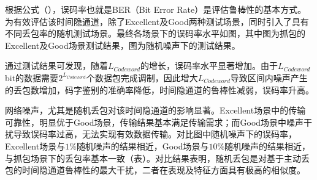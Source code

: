 
根据公式（），误码率也就是BER（Bit Error Rate）是评估鲁棒性的基本方式。为有效评估该时间隐通道，除了Excellent及Good两种测试场景，同时引入了具有不同丢包率的随机测试场景。最终各场景下的误码率水平如图，其中图为抓包的Excellent及Good场景测试结果，图为随机噪声下的测试结果。

通过测试结果可发现，随着$L_{Codeword}$的增长，误码率水平显著增加。由于$L_{Codeword}$ bit的数据需要$2^{L_{Codeword}}$个数据包完成调制，因此增大$L_{Codeword}$导致区间内噪声产生的丢包数增加，码字鉴别的准确率降低，时间隐通道的鲁棒性减弱，误码率升高。

网络噪声，尤其是随机丢包对该时间隐通道的影响显著。Excellent场景中的传输可靠性，明显优于Good场景，传输结果基本满足传输需求；而Good场景中噪声干扰导致误码率过高，无法实现有效数据传输。对比图中随机噪声下的误码率，Excellent场景与$1\%$随机噪声的结果相近，Good场景与$10\%$随机噪声的结果相近，与抓包场景下的丢包率基本一致（表）。对比结果表明，随机丢包是对基于主动丢包的时间隐通道鲁棒性的最大干扰，二者在表现及特征方面具有极高的相似度。

